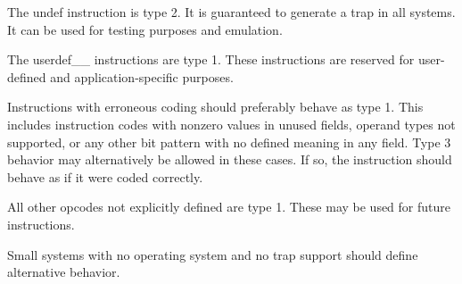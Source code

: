 \documentclass[forwardcom.tex]{subfiles}
\begin{document}
The undef instruction is type 2. It is guaranteed to generate a trap in all systems. It can be used for testing purposes and emulation.
\vspace{2mm}

The userdef\_\_ instructions are type 1. These instructions are reserved for user-defined and application-specific purposes.
\vspace{2mm}

Instructions with erroneous coding should preferably behave as type 1. This includes instruction codes with nonzero values in unused fields, operand types not supported, or any other bit pattern with no defined meaning in any field. Type 3 behavior may alternatively be allowed in these cases. If so, the instruction should behave as if it were coded correctly.
\vspace{2mm}

All other opcodes not explicitly defined are type 1. These may be used for future instructions.
\vspace{2mm}

Small systems with no operating system and no trap support should define alternative behavior.

 
\end{document}
